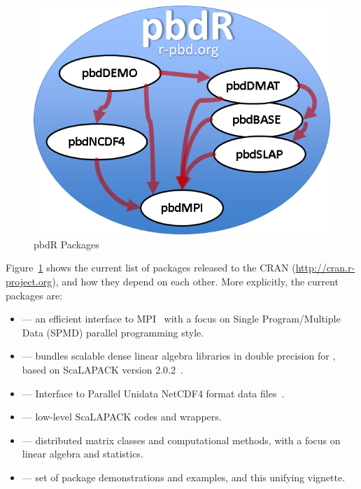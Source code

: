 \begin{figure}[h]
 \centering
 \includegraphics[scale=.65]{pbdDEMO-include/pics/pbdR.png}
 \caption{pbdR Packages}
 \label{fig:pbdrpackages}
\end{figure}

Figure~\ref{fig:pbdrpackages} shows the current list of 
packages released
to the CRAN (\url{http://cran.r-project.org}), and how they depend on each
other. More explicitly, the current  packages
\citep{Chen2012pbdMPIpackage,Chen2012pbdSLAPpackage,Schmidt2012pbdBASEpackage,
Schmidt2012pbdDMATpackage,Patel2013pbdNCDF4package,Schmidt2013pbdDEMOpackage}
are:

\begin{itemize}
 \item {} --- an efficient interface to MPI~\citep{MPI1994} with a
       focus on Single Program/Multiple Data (SPMD)
       parallel programming style.
 \item {} --- bundles scalable dense linear algebra libraries in
       double precision for , based on ScaLAPACK
       version 2.0.2~\citep{slug}.~
 \item {} --- Interface to Parallel Unidata
       NetCDF4 format data files~\citep{netcdf}.
 \item {} --- low-level ScaLAPACK codes and wrappers.
 \item {} --- distributed matrix classes and computational methods,
       with a focus on linear algebra and statistics.
 \item {} --- set of package demonstrations and examples, and this
       unifying vignette.
\end{itemize}


